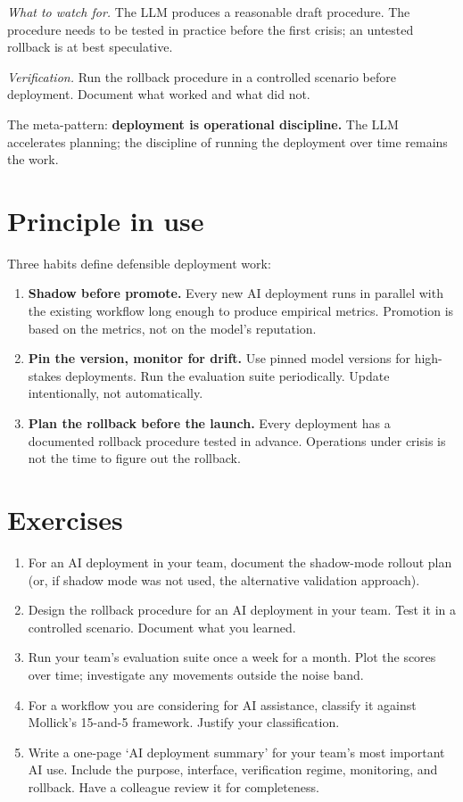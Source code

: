 \documentclass[
  letterpaper,
  11pt]{scrbook}
\begin{document}
\emph{What to watch for.} The LLM produces a reasonable draft procedure.
The procedure needs to be tested in practice before the first crisis; an
untested rollback is at best speculative.

\emph{Verification.} Run the rollback procedure in a controlled scenario
before deployment. Document what worked and what did not.

The meta-pattern: \textbf{deployment is operational discipline.} The LLM
accelerates planning; the discipline of running the deployment over time
remains the work.

\section{Principle in use}\label{principle-in-use-13}

Three habits define defensible deployment work:

\begin{enumerate}
\def\labelenumi{\arabic{enumi}.}
\item
  \textbf{Shadow before promote.} Every new AI deployment runs in
  parallel with the existing workflow long enough to produce empirical
  metrics. Promotion is based on the metrics, not on the model's
  reputation.
\item
  \textbf{Pin the version, monitor for drift.} Use pinned model versions
  for high-stakes deployments. Run the evaluation suite periodically.
  Update intentionally, not automatically.
\item
  \textbf{Plan the rollback before the launch.} Every deployment has a
  documented rollback procedure tested in advance. Operations under
  crisis is not the time to figure out the rollback.
\end{enumerate}

\section{Exercises}\label{exercises-13}

\begin{enumerate}
\def\labelenumi{\arabic{enumi}.}
\item
  For an AI deployment in your team, document the shadow-mode rollout
  plan (or, if shadow mode was not used, the alternative validation
  approach).
\item
  Design the rollback procedure for an AI deployment in your team. Test
  it in a controlled scenario. Document what you learned.
\item
  Run your team's evaluation suite once a week for a month. Plot the
  scores over time; investigate any movements outside the noise band.
\item
  For a workflow you are considering for AI assistance, classify it
  against Mollick's 15-and-5 framework. Justify your classification.
\item
  Write a one-page `AI deployment summary' for your team's most
  important AI use. Include the purpose, interface, verification regime,
  monitoring, and rollback. Have a colleague review it for completeness.
\end{enumerate}
\end{document}
